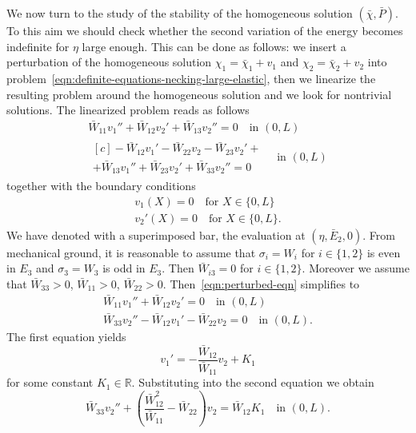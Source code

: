 \documentclass[a4paper,10pt,oneside]{amsbook}
\numberwithin{section}{chapter}
\numberwithin{equation}{chapter}
\theoremstyle{definition}
\begin{document}
We now turn to the study of the stability of the homogeneous solution $(\bar{\chi},\bar{P})$. To this aim we should check whether the second variation of the energy becomes indefinite for $\eta$ large enough. This can be done as follows: we insert a perturbation of the homogeneous solution $\chi_1=\bar\chi_1+v_1$ and $\chi_2=\bar\chi_2+v_2$ into problem~\eqref{eqn:definite-equations-necking-large-elastic}, then we linearize the resulting problem around the homogeneous solution and we look for nontrivial solutions. The linearized problem reads as follows
\begin{subequations}
\label{eqn:perturbed-eqn}
\begin{gather}
\bar W_{11}v_1''+\bar W_{12}v_2'+\bar W_{13}v_2''=0\quad\text{in $(0,L)$} \\
\begin{multlined}[c]
-\bar W_{12}v_1'-\bar W_{22}v_2-\bar W_{23}v_2'+\\
+\bar W_{13}v_1''+\bar W_{23}v_2'+\bar W_{33}v_2''=0
\end{multlined}
\quad\text{in $(0,L)$}
\end{gather}
\end{subequations}
together with the boundary conditions
\begin{gather}
\label{eqn:perturbed-bound}
v_1(X)=0\quad\text{for $X\in\{0,L\}$} \\
v_2'(X)=0\quad\text{for $X\in\{0,L\}$}.
\end{gather}
We have denoted with a superimposed bar, the evaluation at $(\eta,\bar E_2,0)$. From mechanical ground, it is reasonable to assume that $\sigma_i=W_i$ for $i\in\{1,2\}$ is even in $E_3$ and $\sigma_3=W_3$ is odd in $E_3$. Then $\bar W_{i3}=0$ for $i\in\{1,2\}$. Moreover we assume that $\bar W_{33}>0$, $\bar W_{11}>0$, $\bar W_{22}>0$. Then~\eqref{eqn:perturbed-eqn} simplifies to
\begin{subequations}
\begin{gather}
\bar W_{11}v_1''+\bar W_{12}v_2'=0\quad\text{in $(0,L)$} \\
\bar W_{33}v_2''-\bar W_{12}v_1'-\bar W_{22}v_2=0 \quad\text{in $(0,L)$}.
\end{gather}
\end{subequations}
The first equation yields
\begin{equation}
\label{eqn:v1prime}
v_1'=-\frac{\bar{W}_{12}}{\bar{W}_{11}}v_2+K_1
\end{equation}
for some constant $K_1\in\mathbb{R}$. Substituting into the second equation we obtain
\[
\bar W_{33}v_2''+\left(\frac{\bar{W}_{12}^2}{\bar{W}_{11}}-\bar W_{22}\right)v_2=\bar W_{12}K_1 \quad\text{in $(0,L)$}.
\]
\end{document}
